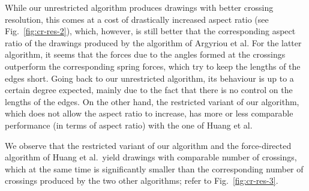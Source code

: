 \documentclass[runningheads]{llncs}
\begin{document}
While our unrestricted algorithm produces drawings with better crossing resolution, this comes at a cost of drastically increased aspect ratio (see Fig.~\ref{fig:cr-res-2}), which, however, is still better that the corresponding aspect ratio of the drawings produced by the algorithm of Argyriou et al. For the latter algorithm, it seems that the forces due to the angles formed at the crossings outperform the corresponding spring forces, which try to keep the lengths of the edges short. Going back to our unrestricted algorithm, its behaviour is up to a certain degree expected, mainly due to the fact that there is no control on the lengths of the edges.
On the other hand, the restricted variant of our algorithm, which does not allow the aspect ratio to increase, has more or less comparable performance (in terms of aspect ratio) with the one of Huang et al.

We observe that the restricted variant of our algorithm and the force-directed algorithm of Huang et al.\ yield drawings with comparable number of crossings, which at the same time is significantly smaller than the corresponding number of crossings produced by the two other algorithms; refer to Fig.~\ref{fig:cr-res-3}.
\end{document}
